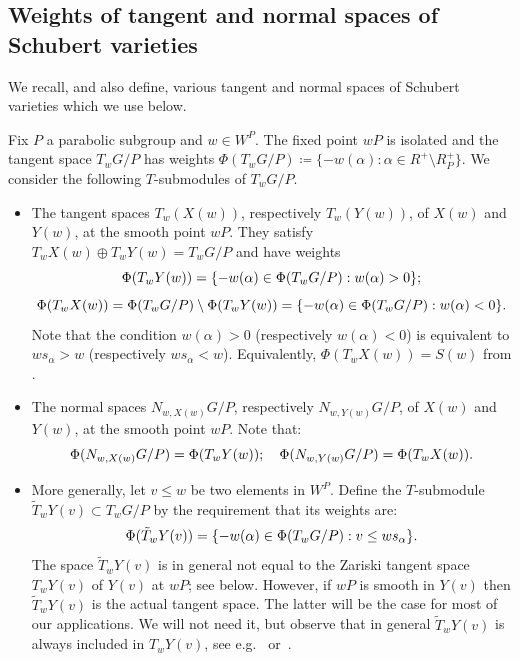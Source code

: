 \documentclass[11pt]{article}
\theoremstyle{definition}
\numberwithin{equation}{section}
\begin{document}
\subsection{Weights of tangent and normal spaces of Schubert varieties}\label{ss:weights} We recall, and also define, various tangent and normal spaces of Schubert varieties which we use below. 

Fix $P$ a parabolic subgroup and $w \in W^P$. The fixed point $wP$ is isolated and the tangent space $T_w G/P$ has weights
$\Phi(T_w G/P) \coloneqq  \{ - w(\alpha) : \alpha \in R^+ \setminus R_P^+\}$.  
We consider the following $T$-submodules of $T_w G/P$.

\begin{itemize} \item The tangent spaces $T_w (X(w))$, respectively $T_w(Y(w))$, of $X(w)$ and $Y(w)$, at the smooth point $wP$. They satisfy $T_w X(w) \oplus T_w Y(w) = T_w G/P$ and have weights
	\[ \Phi(T_w Y(w)) = \{ - w (\alpha) \in \Phi (T_w G/P): w(\alpha) > 0 \} \/; \] 
	\[ \Phi(T_w X(w)) = \Phi(T_w G/P) \setminus \Phi(T_w Y(w)) = \{ - w (\alpha) \in \Phi (T_w G/P): w(\alpha) < 0 \} \/. \]
	Note that the condition $w(\alpha)>0$ (respectively $w(\alpha)<0$) is equivalent to $w s_\alpha > w$ (respectively $ws_\alpha < w$). Equivalently, $\Phi(T_w X(w))=S(w)$ from .
	\item The normal spaces $N_{w,X(w)}G/P$, respectively $N_{w,Y(w)}G/P$, of $X(w)$ and $Y(w)$, at the smooth point $wP$. Note that:
	\[ \Phi(N_{w,X(w)}G/P) =\Phi(T_w Y(w))\/; \quad \Phi(N_{w,Y(w)} G/P) =\Phi(T_w X(w)) \/. \]
	
	\item More generally, let $v \le w$ be two elements in $W^P$. Define the $T$-submodule $\tilde{T}_w Y(v)\subset T_w G/P$ by the requirement that its weights are:
	\[ \Phi(\tilde{T}_w Y(v)) = \{ -w(\alpha) \in \Phi(T_w G/P): v \leq w s_\alpha \} \/. \]
	The space $\tilde{T}_w Y(v)$ is in general not equal to the Zariski tangent 
	space $T_w Y(v)$ of $Y(v)$ at $wP$; see  below.
	However, if $wP$ is smooth in $Y(v)$ then $\tilde{T}_w Y(v)$ is the actual tangent 
	space. The latter will be the case for most of our applications. We will not need it, but observe
	that in general $\tilde{T}_w Y(v)$ is always included in $T_w Y(v)$, see e.g.~\cite{carrell:bruhat}
	or~\cite[Prop.~12.1.7]{kumar:book}.
	

\end{itemize}
\end{document}

